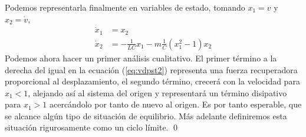 \begin{example}
Podemos representarla finalmente en variables de estado, tomando $x_1=v$ y $x_2=\dot{v}$,
\begin{align}
\dot{x}_1 &= x_2 \label{eq:vpst1} \\
\dot{x}_2 &= -\frac{1}{LC}x_1 - m\frac{1}{C}(x_1^2-1)x_2 \label{eq:vdpst2}
\end{align}
Podemos ahora hacer un primer análisis cualitativo. El primer término a la derecha del igual en  la ecuación (\ref{eq:vdpst2}) representa una fuerza recuperadora proporcional al desplazamiento, el segundo término, crecerá con la velocidad para $x_1 < 1$, alejando así al sistema del origen  y representará un término disipativo para $x_1 > 1$ acercándolo por tanto de nuevo al origen. Es por tanto esperable, que se alcance
algún tipo de situación de equilibrio. Más adelante definiremos esta situación rigurosamente como un ciclo límite. \qed
\end{example} 
